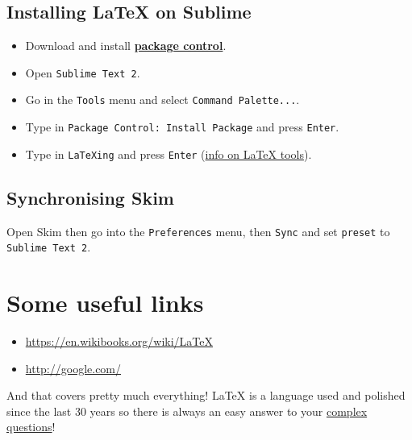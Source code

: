 \documentclass[a4paper,11pt]{article}
\begin{document}
\subsection{Installing LaTeX on Sublime}
\begin{itemize}
\item Download and install \href{https://packagecontrol.io/}{\textbf{package control}}.
\item Open \texttt{Sublime Text 2}.
\item Go in the \texttt{Tools} menu and select \texttt{Command Palette...}.
\item Type in \texttt{Package Control: Install Package} and press \texttt{Enter}.
\item Type in \texttt{LaTeXing} %
and press \texttt{Enter} (\href{https://github.com/SublimeText/LaTeXTools/blob/master/README.markdown}{info on LaTeX tools}).
\end{itemize}

\subsection{Synchronising Skim}
Open Skim then go into the \texttt{Preferences} menu, then \texttt{Sync} and set \texttt{preset} to \texttt{Sublime Text 2}.

\section{Some useful links}
\begin{itemize}
\item \url{https://en.wikibooks.org/wiki/LaTeX}
\item \url{http://google.com/}
\end{itemize}
And that covers pretty much everything!
LaTeX is a language used and polished since the last 30 years so there is always an easy answer to your \href{http://lmgtfy.com/?q=How+to+make+a+macro+for+a+table+environment+in+latex}{complex questions}!
\end{document}
